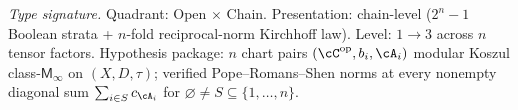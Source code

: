 \begin{theorem}
\label{thm:hdm-m-infty-nfold-kunneth}
\emph{Type signature.} Quadrant: Open $\times$ Chain. Presentation:
chain-level ($2^n - 1$ Boolean strata + $n$-fold reciprocal-norm
Kirchhoff law). Level: $1\!\to\!3$ across $n$ tensor factors.
Hypothesis package: $n$ chart pairs $(\cC^{\mathrm{op}}, b_i, \cA_i)$
modular Koszul class-$\mathsf{M}_\infty$ on $(X, D, \tau)$; verified
Pope--Romans--Shen norms at every nonempty diagonal sum
$\sum_{i\in S} c_{\cA_i}$ for $\varnothing\neq S\subseteq\{1,\ldots,n\}$.


\end{theorem}

